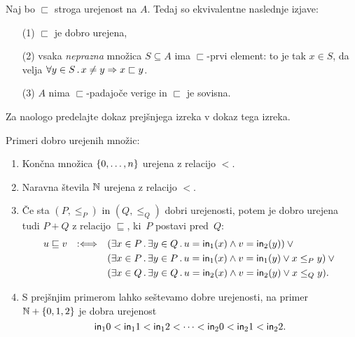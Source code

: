 \begin{izrek}
  \label{izr:dobra-urejenost-karakterizacija}
  Naj bo $\sqsubset$ stroga urejenost na $A$. Tedaj so ekvivalentne naslednje izjave:
  \begin{enumerate}
  \item[(1)] $\sqsubset$ je dobro urejena,
  \item[(2)] vsaka \emph{neprazna} množica $S \subseteq A$ ima $\sqsubset$-prvi element: to je tak $x \in S$, da velja
    $\forall y \in S \,.\, x \neq y \Rightarrow x \sqsubset y$.
  \item[(3)] $A$ nima $\sqsubset$-padajoče verige in $\sqsubset$ je sovisna.
  \end{enumerate}
\end{izrek}

\begin{dokaz}
  Za naologo predelajte dokaz prejšnjega izreka v dokaz tega izreka.
\end{dokaz}

\begin{primer}
  Primeri dobro urejenih množic:
  \begin{enumerate}
  \item Končna množica $\left\{0, \ldots, n\right\}$ urejena z relacijo $<$.

  \item Naravna števila $\mathbb{N}$ urejena z relacijo $<$.

  \item Če sta $(P, \leq_P)$ in $(Q, \leq_Q)$ dobri urejenosti, potem je dobro urejena tudi $P + Q$ z relacijo
    $\sqsubseteq$, ki~$P$ postavi pred~$Q$:
    \begin{equation*}
      u \sqsubseteq v \quad {{:}{\Longleftrightarrow}}\quad
      \begin{aligned}[t]
        &(\exists x \in P \,.\, \exists y \in Q \,.\, u = \mathsf{in}_{1}(x) \land v = \mathsf{in}_{2}(y)) \lor {}\\
        &(\exists x \in P \,.\, \exists y \in P \,.\, u = \mathsf{in}_{1}(x) \land v = \mathsf{in}_{1}(y) \lor x \leq_P y) \lor {}\\
        &(\exists x \in Q \,.\, \exists y \in Q \,.\, u = \mathsf{in}_{2}(x) \land v = \mathsf{in}_{2}(y) \lor x \leq_Q y).
      \end{aligned}
    \end{equation*}

  \item
    S prejšnjim primerom lahko seštevamo dobre urejenosti, na primer $\mathbb{N} + \left\{0, 1, 2\right\}$ je dobra
    urejenost
    \begin{equation*}
      \mathsf{in}_{1}{0} < \mathsf{in}_{1}{1} < \mathsf{in}_{1}{2} < \cdots < \mathsf{in}_{2}{0} < \mathsf{in}_{2}{1} < \mathsf{in}_{2}{2}.
    \end{equation*}
  \end{enumerate}
\end{primer}

